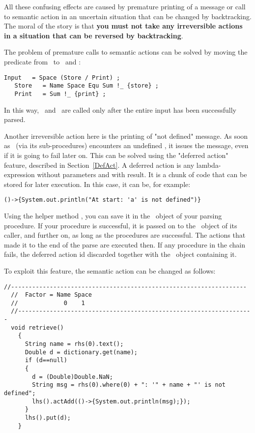 All these confusing effects are caused by premature printing of a message
or call to semantic action in an uncertain situation that can be changed by backtracking.
%
The moral of the story is that \textbf{you must not take any irreversible actions
in a situation that can be reversed by backtracking}.

The problem of premature calls to semantic actions 
can be solved by moving the predicate  from \Input\ 
to \Store\ and \Print:

\small
\begin{Verbatim}[frame=single,framesep=2mm,samepage=true,xleftmargin=15mm,xrightmargin=15mm,baselinestretch=0.8]
   Input   = Space (Store / Print) ;
   Store   = Name Space Equ Sum !_ {store} ;
   Print   = Sum !_ {print} ;
\end{Verbatim}
\normalsize

In this way, \Storea\ and \Printa\ are called only after the entire input
has been successfully parsed.

Another irreversible action here is the printing of "not defined" message.
As soon as \Print\ (via its sub-procedures) encounters an undefined ,
it issues the message, even if it is going to fail later on.
This can be solved using the "deferred action" feature, described in Section~\ref{DefAct}.
A deferred action is any lambda-expression without parameters and with \tx{void} result.
It  is a chunk of code that can be stored for later execution.
In this case, it can be, for example: 

\small
\begin{Verbatim}[frame=single,framesep=2mm,samepage=true,xleftmargin=15mm,xrightmargin=15mm,baselinestretch=0.8]
   ()->{System.out.println("At start: 'a' is not defined")}
\end{Verbatim}
\normalsize

Using the helper method , you can save it in the \Phrase\ object of your parsing procedure.
If your procedure is successful, it is passed on to the \Phrase\ object of its caller, and further on,
as long as the procedures are successful.
The actions that made it to the end of the parse are executed then.
If any procedure in the chain fails, the deferred action id discarded together with the \Phrase\ 
object containing it.

To exploit this feature, the semantic action  can be changed as follows:

\small
\begin{Verbatim}[frame=single,framesep=2mm,samepage=true,xleftmargin=15mm,xrightmargin=15mm,baselinestretch=0.8]
  //-------------------------------------------------------------------
  //  Factor = Name Space
  //             0    1
  //-------------------------------------------------------------------
  void retrieve()
    {
      String name = rhs(0).text();
      Double d = dictionary.get(name);
      if (d==null)
      {
        d = (Double)Double.NaN;
        String msg = rhs(0).where(0) + ": '" + name + "' is not defined";
        lhs().actAdd(()->{System.out.println(msg);});
      }
      lhs().put(d);
    }
\end{Verbatim}
\normalsize

